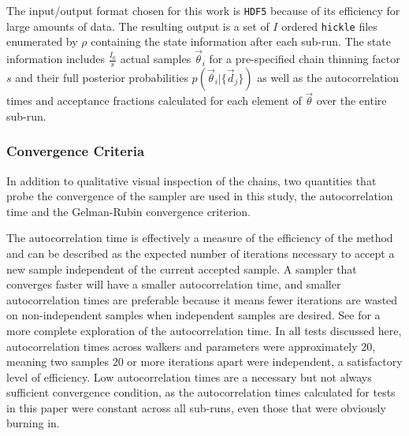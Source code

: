 The input/output format chosen for this work is \texttt{HDF5} because of its efficiency for large amounts of data.  
The resulting output is a set of $I$ ordered \texttt{hickle} files enumerated by $\rho$ containing the state information after each sub-run.  
The state information includes $\frac{I_{0}}{s}$ actual samples $\vec{\theta}_{i}$ for a pre-specified chain thinning factor $s$ and their full posterior probabilities $p(\vec{\theta}_{i}|\{\vec{d}_{j}\})$ as well as the autocorrelation times and acceptance fractions calculated for each element of $\vec{\theta}$ over the entire sub-run.  

\subsubsection{Convergence Criteria}

In addition to qualitative visual inspection of the chains, two quantities that probe the convergence of the sampler are used in this study, the autocorrelation time and the Gelman-Rubin convergence criterion.  


The autocorrelation time is effectively a measure of the efficiency of the method and can be described as the expected number of iterations necessary to accept a new sample independent of the current accepted sample.  
A sampler that converges faster will have a smaller autocorrelation time, and smaller autocorrelation times are preferable because it means fewer iterations are wasted on non-independent samples when independent samples are desired.  
See \citet{Foreman-Mackey2013} for a more complete exploration of the autocorrelation time.  
In all tests discussed here, autocorrelation times across walkers and parameters were approximately 20, meaning two samples 20 or more iterations apart were independent, a satisfactory level of efficiency.  
Low autocorrelation times are a necessary but not always sufficient convergence condition, as the autocorrelation times calculated for tests in this paper were constant across all sub-runs, even those that were obviously burning in.  

